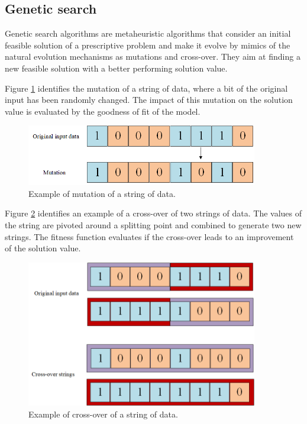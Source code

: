 \subsection{Genetic search} \label{geneticSearch}
Genetic search algorithms are metaheuristic algorithms that consider an initial feasible solution of a prescriptive problem and make it evolve by mimics of the natural evolution mechanisms as mutations and cross-over. They aim at finding a new feasible solution with a better performing solution value. \par

Figure \ref{fig_mutation} identifies the mutation of a string of data, where a bit of the original input has been randomly changed. The impact of this mutation on the solution value is evaluated by the goodness of fit of the model.

\begin{figure}[hbt!]
\centering
\includegraphics[width=0.9\textwidth]{SectionLetsMath/nonLinearMethods_fig/fig_mutation.png}
\captionsetup{type=figure}
\caption{Example of mutation of a string of data.}
\label{fig_mutation}
\end{figure}

Figure \ref{fig_crossover} identifies an example of a cross-over of two strings of data. The values of the string are pivoted around a splitting point and combined to generate two new strings. The fitness function evaluates if the cross-over leads to an improvement of the solution value.


\begin{figure}[hbt!]
\centering
\includegraphics[width=0.9\textwidth]{SectionLetsMath/nonLinearMethods_fig/fig_crossover.png}
\captionsetup{type=figure}
\caption{Example of cross-over of a string of data.}
\label{fig_crossover}
\end{figure}


